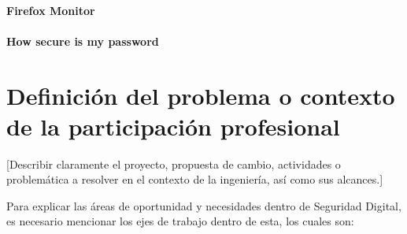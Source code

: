 \documentclass[12pt]{caltech_thesis}
\begin{document}
\subsubsection{Firefox Monitor}

\subsubsection{How secure is my password}




\chapter{Definición del problema o contexto de la participación profesional}

[Describir claramente el proyecto, propuesta de cambio, actividades o problemática a resolver en el contexto de la ingeniería, así como sus alcances.]

Para explicar las áreas de oportunidad y necesidades dentro de Seguridad Digital, es necesario mencionar los ejes de trabajo dentro de esta, los cuales son:
\end{document}
